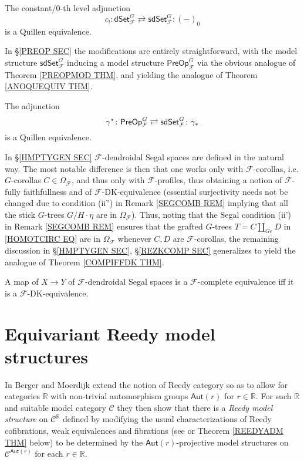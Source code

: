 \documentclass[a4paper,10pt
 ,draft
]{article}%
\begin{document}
\begin{theorem}\label{FINC0AGJ THM}
	The constant/$0$-th level adjunction
	\[
	c_!\colon 
	\mathsf{dSet}^G_{\mathcal{F}} \rightleftarrows \mathsf{sdSet}^G_{\mathcal{F}}
	\colon (-)_0
	\]
	is a Quillen equivalence.
\end{theorem}
In \S \ref{PREOP SEC} the modifications are entirely straightforward, with the model structure 
$\mathsf{sdSet}^G_{\mathcal{F}}$
inducing a model structure
$\mathsf{PreOp}^G_{\mathcal{F}}$ via the obvious analogue of 
Theorem \ref{PREOPMOD THM}, and yielding the analogue of Theorem \ref{ANOQUEQUIV THM}.
\begin{theorem}\label{FANOQUEQUIV THM}
The adjunction
\[
	\gamma^{\**} \colon \mathsf{PreOp}^G_{\mathcal{F}}
\rightleftarrows
	\mathsf{sdSet}^G_{\mathcal{F}} \colon \gamma_{\**}
\]
is a Quillen equivalence.
\end{theorem}
In \S \ref{HMPTYGEN SEC} $\mathcal{F}$-dendroidal Segal spaces are defined in the natural way. The most notable difference is then that one works only with 
$\mathcal{F}$-corollas, i.e. $G$-corollas
$C \in \Omega_{\mathcal{F}}$,
and thus only with $\mathcal{F}$-profiles, thus obtaining a notion of $\mathcal{F}$-fully faithfullness and of $\mathcal{F}$-DK-equivalence 
(essential surjectivity needs not be changed due to condition (ii'') in Remark \ref{SEGCOMB REM} implying that all the stick $G$-trees $G/H \cdot \eta$ are in $\Omega_{\mathcal{F}}$).
Thus, noting that the Segal condition 
(ii') in Remark \ref{SEGCOMB REM}
ensures that the grafted $G$-trees 
$T=C \amalg_{Ge} D$ in \eqref{HOMOTCIRC EQ}
are in $\Omega_{\mathcal{F}}$
whenever $C,D$ are $\mathcal{F}$-corollas,
the remaining discussion in 
\S \ref{HMPTYGEN SEC}, \S \ref{REZKCOMP SEC}
generalizes to yield the analogue of 
Theorem \ref{COMPIFFDK THM}.
\begin{theorem}\label{FCOMPIFFDK THM}
A map of $X \to Y$ of $\mathcal{F}$-dendroidal Segal spaces is a $\mathcal{F}$-complete equivalence iff it is a $\mathcal{F}$-DK-equivalence.
\end{theorem}



\appendix

\section{Equivariant Reedy model structures}\label{EQREED AP}


In \cite{BM11} Berger and Moerdijk extend the notion of Reedy category so as to allow for categories $\mathbb{R}$
 with non-trivial automorphism groups 
 $\mathsf{Aut}(r)$ for $r \in \mathbb{R}$.
For such $\mathbb{R}$ and suitable model category $\mathcal{C}$ they then show that there is a 
\textit{Reedy model structure}
on $\mathcal{C}^{\mathbb{R}}$
defined by modifying the usual characterizations of
Reedy cofibrations, weak equivalences and fibrations
(see \cite[Thm. 1.6]{BM11} or
Theorem \ref{REEDYADM THM} below)
 to be determined by the $\mathsf{Aut}(r)$-projective model structures
on $\mathcal{C}^{\mathsf{Aut}(r)}$
for each $r \in \mathbb{R}$. 
\end{document}
